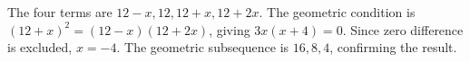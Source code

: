 The four terms are $12-x,12,12+x,12+2x$. The geometric condition is $(12+x)^2=(12-x)(12+2x)$, giving $3x(x+4)=0$. Since zero difference is excluded, $\boxed{x=-4}$. The geometric subsequence is $16,8,4$, confirming the result.
